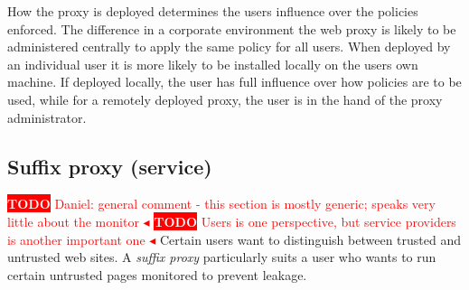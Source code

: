 \documentclass{llncs}
\newcommand{\todo}[1]{\colorbox{red}{\textcolor{white}{\sffamily\bfseries\scriptsize TODO}} \textcolor{red}{#1} \textcolor{red}{$\blacktriangleleft$}}
\begin{document}
How the proxy is 
deployed determines the users influence over 
the policies enforced.
The difference in a corporate environment the web proxy is likely to be 
administered centrally to apply the same policy for all users. When deployed by 
an individual user it is more likely to be installed locally on the users own machine.
If deployed locally, the user has full influence over 
how policies are to be used, while for a remotely deployed proxy, the user is 
in the hand of the proxy administrator. 





\subsection{Suffix proxy (service)}
\label{sec:arch-suffix}
\todo{Daniel: general comment - this section is mostly generic; speaks very little about the monitor}
\todo{Users is one perspective, but  service providers is another
  important one}
Certain users want to distinguish between trusted and untrusted web sites.
A \emph{suffix proxy} particularly suits a user who wants to run certain untrusted 
pages monitored to prevent leakage.
\end{document}
